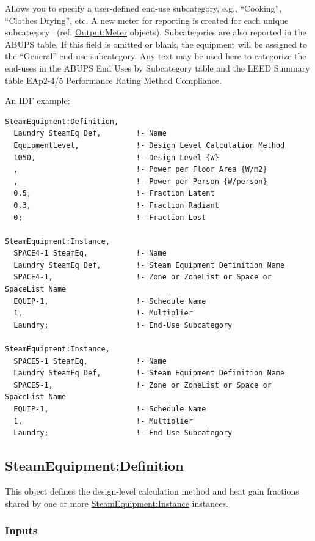 Allows you to specify a user-defined end-use subcategory, e.g., ``Cooking'', ``Clothes Drying'', etc. A new meter for reporting is created for each unique subcategory~ (ref: \hyperref[outputmeter-and-outputmetermeterfileonly]{Output:Meter} objects). Subcategories are also reported in the ABUPS table. If this field is omitted or blank, the equipment will be assigned to the ``General'' end-use subcategory. Any text may be used here to categorize the end-uses in the ABUPS End Uses by Subcategory table and the LEED Summary table EAp2-4/5 Performance Rating Method Compliance.

An IDF example:

\begin{lstlisting}
SteamEquipment:Definition,
  Laundry SteamEq Def,        !- Name
  EquipmentLevel,             !- Design Level Calculation Method
  1050,                       !- Design Level {W}
  ,                           !- Power per Floor Area {W/m2}
  ,                           !- Power per Person {W/person}
  0.5,                        !- Fraction Latent
  0.3,                        !- Fraction Radiant
  0;                          !- Fraction Lost

SteamEquipment:Instance,
  SPACE4-1 SteamEq,           !- Name
  Laundry SteamEq Def,        !- Steam Equipment Definition Name
  SPACE4-1,                   !- Zone or ZoneList or Space or SpaceList Name
  EQUIP-1,                    !- Schedule Name
  1,                          !- Multiplier
  Laundry;                    !- End-Use Subcategory

SteamEquipment:Instance,
  SPACE5-1 SteamEq,           !- Name
  Laundry SteamEq Def,        !- Steam Equipment Definition Name
  SPACE5-1,                   !- Zone or ZoneList or Space or SpaceList Name
  EQUIP-1,                    !- Schedule Name
  1,                          !- Multiplier
  Laundry;                    !- End-Use Subcategory
\end{lstlisting}

\subsection{SteamEquipment:Definition}\label{steamequipmentdefinition}

This object defines the design-level calculation method and heat gain fractions shared by one or more \hyperref[steamequipmentinstance]{SteamEquipment:Instance} instances.

\subsubsection{Inputs}\label{inputs-6-steamequipmentdefinition}

